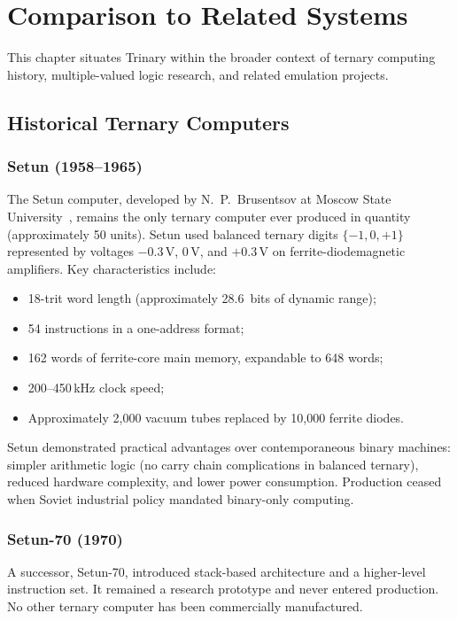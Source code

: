 \documentclass[12pt,a4paper,twoside]{book}
\theoremstyle{trinarytheorem}
\theoremstyle{trinarydefinition}
\begin{document}
\chapter{Comparison to Related Systems}
\label{ch:related}

This chapter situates Trinary within the broader context of ternary
computing history, multiple-valued logic research, and related emulation
projects.

\section{Historical Ternary Computers}

\subsection{Setun (1958--1965)}

The Setun computer, developed by N.~P.~Brusentsov at Moscow State
University~\cite{brusentsov1965setun}, remains the only ternary computer
ever produced in quantity (approximately 50 units). Setun used balanced
ternary digits $\{-1,0,+1\}$ represented by voltages $-0.3$\,V, $0$\,V,
and $+0.3$\,V on ferrite-diodemagnetic amplifiers. Key characteristics
include:
\begin{itemize}
    \item 18-trit word length (approximately 28.6~bits of dynamic range);
    \item 54 instructions in a one-address format;
    \item 162 words of ferrite-core main memory, expandable to 648 words;
    \item 200--450\,kHz clock speed;
    \item Approximately 2,000 vacuum tubes replaced by 10,000 ferrite diodes.
\end{itemize}

Setun demonstrated practical advantages over contemporaneous binary
machines: simpler arithmetic logic (no carry chain complications in
balanced ternary), reduced hardware complexity, and lower power
consumption. Production ceased when Soviet industrial policy mandated
binary-only computing.

\subsection{Setun-70 (1970)}

A successor, Setun-70, introduced stack-based architecture and a
higher-level instruction set. It remained a research prototype and never
entered production. No other ternary computer has been commercially
manufactured.
\end{document}
